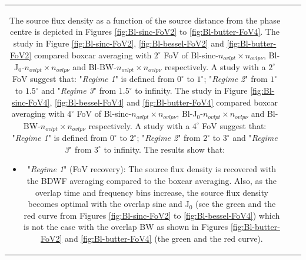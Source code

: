 \documentclass[useAMS,usenatbib]{mn2e}
\begin{document}
\begin{tabular}{*3{c}}
The source flux density as a function of the source distance from the phase centre is depicted in Figures \ref{fig:Bl-sinc-FoV2} to 
\ref{fig:Bl-butter-FoV4}.
The study in Figure \ref{fig:Bl-sinc-FoV2}, \ref{fig:Bl-bessel-FoV2} and \ref{fig:Bl-butter-FoV2} 
compared boxcar averaging with $2^{\circ}$ FoV of Bl-sinc-$n_{ovlpt}\times n_{ovlp\nu}$, Bl-J$_0$-$n_{ovlpt}\times n_{ovlp\nu}$ and  
Bl-BW-$n_{ovlpt}\times n_{ovlp\nu}$ respectively. A study with a $2^{\circ}$ FoV suggest that: "\textit{Regime 1}" is defined from 
$0^\circ$ to $1^\circ$; "\textit{Regime 2}" from $1^\circ$ to $1.5^\circ$ and "\textit{Regime 3}" from $1.5^\circ$ to infinity.
The study in Figure \ref{fig:Bl-sinc-FoV4}, \ref{fig:Bl-bessel-FoV4} and \ref{fig:Bl-butter-FoV4} 
compared boxcar averaging with $4^{\circ}$ FoV of Bl-sinc-$n_{ovlpt}\times n_{ovlp\nu}$, Bl-J$_0$-$n_{ovlpt}\times n_{ovlp\nu}$ and  
Bl-BW-$n_{ovlpt}\times n_{ovlp\nu}$ respectively.  A study with a $4^{\circ}$ FoV suggest that: "\textit{Regime 1}" is defined from 
$0^\circ$ 
to $2^\circ$; "\textit{Regime 2}" from $2^\circ$ to $3^\circ$ and "\textit{Regime 3}" from $3^\circ$ to infinity. 
% 
The results show that:
\begin{itemize}
 \item "\textit{Regime 1}" (FoV recovery): The source flux density is recovered with the BDWF averaging compared to the boxcar averaging. 
Also, as the overlap time and frequency bins increase, the source flux density becomes optimal with the overlap sinc and J$_0$ (see the 
green and the red curve from Figures \ref{fig:Bl-sinc-FoV2} to \ref{fig:Bl-bessel-FoV4}) which is not the case with the overlap BW as shown 
in Figures \ref{fig:Bl-butter-FoV2} and \ref{fig:Bl-butter-FoV4} (the green and the red curve).

\end{itemize}
\end{tabular}
\end{document}
